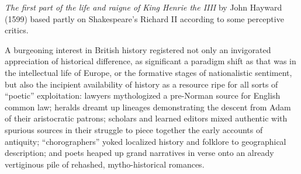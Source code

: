 \emph{The first part of the life and raigne of King Henrie the IIII} by John Hayward (1599) based partly on Shakespeare's Richard II according to some perceptive critics.\nocite{hayward_first_1599}

A burgeoning interest in British history registered not only an invigorated appreciation of historical difference, as significant a paradigm shift as that was in the intellectual life of Europe, or the formative stages of nationalistic sentiment, but also the incipient availability of history as a resource ripe for all sorts of ``poetic'' exploitation: lawyers mythologized a pre-Norman source for English common law; heralds dreamt up lineages demonstrating the descent from Adam of their aristocratic patrons; scholars and learned editors mixed authentic with spurious sources in their struggle to piece together the early accounts of antiquity; ``chorographers'' yoked localized history and folklore to geographical description; and poets heaped up grand narratives in verse onto an already vertiginous pile of rehashed, mytho-historical romances.

